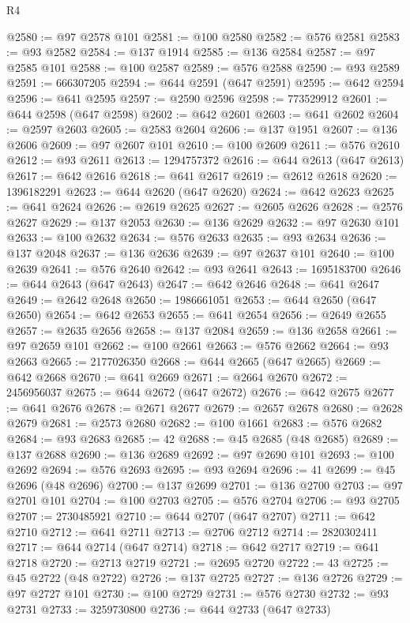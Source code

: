 \begin{lexlean}{R4}
\begin{coremodule}
@2580 := @97 @2578 @101
@2581 := @100 @2580
@2582 := @576 @2581
@2583 := @93 @2582
@2584 := @137 @1914
@2585 := @136 @2584
@2587 := @97 @2585 @101
@2588 := @100 @2587
@2589 := @576 @2588
@2590 := @93 @2589
@2591 := 666307205
@2594 := @644 @2591 (@647 @2591)
@2595 := @642 @2594
@2596 := @641 @2595
@2597 := @2590 @2596
@2598 := 773529912
@2601 := @644 @2598 (@647 @2598)
@2602 := @642 @2601
@2603 := @641 @2602
@2604 := @2597 @2603
@2605 := @2583 @2604
@2606 := @137 @1951
@2607 := @136 @2606
@2609 := @97 @2607 @101
@2610 := @100 @2609
@2611 := @576 @2610
@2612 := @93 @2611
@2613 := 1294757372
@2616 := @644 @2613 (@647 @2613)
@2617 := @642 @2616
@2618 := @641 @2617
@2619 := @2612 @2618
@2620 := 1396182291
@2623 := @644 @2620 (@647 @2620)
@2624 := @642 @2623
@2625 := @641 @2624
@2626 := @2619 @2625
@2627 := @2605 @2626
@2628 := @2576 @2627
@2629 := @137 @2053
@2630 := @136 @2629
@2632 := @97 @2630 @101
@2633 := @100 @2632
@2634 := @576 @2633
@2635 := @93 @2634
@2636 := @137 @2048
@2637 := @136 @2636
@2639 := @97 @2637 @101
@2640 := @100 @2639
@2641 := @576 @2640
@2642 := @93 @2641
@2643 := 1695183700
@2646 := @644 @2643 (@647 @2643)
@2647 := @642 @2646
@2648 := @641 @2647
@2649 := @2642 @2648
@2650 := 1986661051
@2653 := @644 @2650 (@647 @2650)
@2654 := @642 @2653
@2655 := @641 @2654
@2656 := @2649 @2655
@2657 := @2635 @2656
@2658 := @137 @2084
@2659 := @136 @2658
@2661 := @97 @2659 @101
@2662 := @100 @2661
@2663 := @576 @2662
@2664 := @93 @2663
@2665 := 2177026350
@2668 := @644 @2665 (@647 @2665)
@2669 := @642 @2668
@2670 := @641 @2669
@2671 := @2664 @2670
@2672 := 2456956037
@2675 := @644 @2672 (@647 @2672)
@2676 := @642 @2675
@2677 := @641 @2676
@2678 := @2671 @2677
@2679 := @2657 @2678
@2680 := @2628 @2679
@2681 := @2573 @2680
@2682 := @100 @1661
@2683 := @576 @2682
@2684 := @93 @2683
@2685 := 42
@2688 := @45 @2685 (@48 @2685)
@2689 := @137 @2688
@2690 := @136 @2689
@2692 := @97 @2690 @101
@2693 := @100 @2692
@2694 := @576 @2693
@2695 := @93 @2694
@2696 := 41
@2699 := @45 @2696 (@48 @2696)
@2700 := @137 @2699
@2701 := @136 @2700
@2703 := @97 @2701 @101
@2704 := @100 @2703
@2705 := @576 @2704
@2706 := @93 @2705
@2707 := 2730485921
@2710 := @644 @2707 (@647 @2707)
@2711 := @642 @2710
@2712 := @641 @2711
@2713 := @2706 @2712
@2714 := 2820302411
@2717 := @644 @2714 (@647 @2714)
@2718 := @642 @2717
@2719 := @641 @2718
@2720 := @2713 @2719
@2721 := @2695 @2720
@2722 := 43
@2725 := @45 @2722 (@48 @2722)
@2726 := @137 @2725
@2727 := @136 @2726
@2729 := @97 @2727 @101
@2730 := @100 @2729
@2731 := @576 @2730
@2732 := @93 @2731
@2733 := 3259730800
@2736 := @644 @2733 (@647 @2733)

\end{coremodule}
\end{lexlean}
